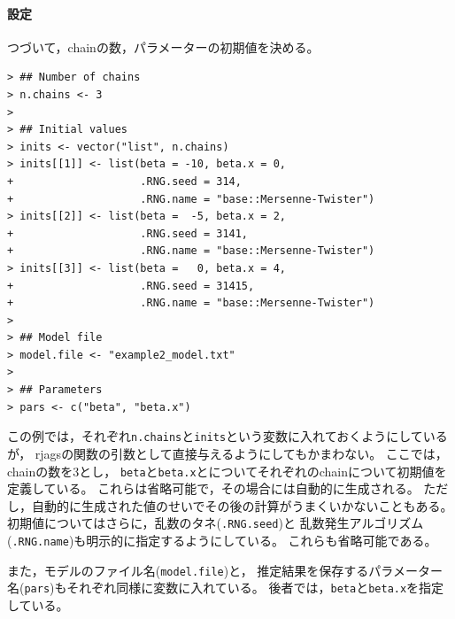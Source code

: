 \documentclass[11pt,uplatex]{jsarticle}
\begin{document}
%

\paragraph{設定}

つづいて，chainの数，パラメーターの初期値を決める。

\begin{lstlisting}
> ## Number of chains
> n.chains <- 3
> 
> ## Initial values
> inits <- vector("list", n.chains)
> inits[[1]] <- list(beta = -10, beta.x = 0,
+                    .RNG.seed = 314,
+                    .RNG.name = "base::Mersenne-Twister")
> inits[[2]] <- list(beta =  -5, beta.x = 2,
+                    .RNG.seed = 3141,
+                    .RNG.name = "base::Mersenne-Twister")
> inits[[3]] <- list(beta =   0, beta.x = 4,
+                    .RNG.seed = 31415,
+                    .RNG.name = "base::Mersenne-Twister")
> 
> ## Model file
> model.file <- "example2_model.txt"
> 
> ## Parameters
> pars <- c("beta", "beta.x")
\end{lstlisting}

この例では，それぞれ\texttt{n.chains}と\texttt{inits}という変数に入れておくようにしているが，
\textsf{rjags}の関数の引数として直接与えるようにしてもかまわない。
ここでは，chainの数を3とし，
\texttt{beta}と\texttt{beta.x}とについてそれぞれのchainについて初期値を
定義している。
これらは省略可能で，その場合には自動的に生成される。
ただし，自動的に生成された値のせいでその後の計算がうまくいかないこともある。
初期値についてはさらに，乱数のタネ(\texttt{.RNG.seed})と
乱数発生アルゴリズム(\texttt{.RNG.name})も明示的に指定するようにしている。
これらも省略可能である。

また，モデルのファイル名(\texttt{model.file})と，
推定結果を保存するパラメーター名(\texttt{pars})もそれぞれ同様に変数に入れている。
後者では，\texttt{beta}と\texttt{beta.x}を指定している。
\end{document}
